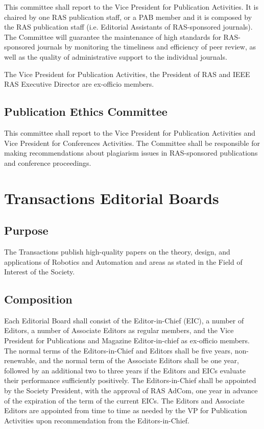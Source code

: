 \documentclass[10pt]{article}
\begin{document}
This committee shall report to the Vice President for Publication Activities. It is chaired by one RAS publication staff, or a PAB member and it is composed by the RAS publication staff (i.e. Editorial Assistants of RAS-sponsored journals). The Committee will guarantee the maintenance of high standards for RAS-sponsored journals by monitoring the timeliness and efficiency of peer review, as well as the quality of administrative support to the individual journals.

The Vice President for Publication Activities, the President of RAS and IEEE RAS Executive Director are ex-officio members.


\subsection{Publication Ethics Committee}

This committee shall report to the Vice President for Publication Activities and Vice President for Conferences Activities. The Committee shall be responsible for making recommendations about plagiarism issues in RAS-sponsored publications and conference proceedings.


\section{Transactions Editorial Boards}
\label{TEB}

\subsection{Purpose}

The Transactions publish high-quality papers on the theory, design, and applications of Robotics and Automation and areas as stated in the Field of Interest of the Society.

\subsection{Composition}
\label{TEB:Composition}
Each Editorial Board shall consist of the Editor-in-Chief (EIC), a number of Editors, a number of Associate Editors as regular members, and the Vice President for Publications and Magazine Editor-in-chief as ex-officio members.  The normal terms of the Editors-in-Chief and Editors shall be five years, non-renewable, and the normal term of the Associate Editors shall be one year, followed by an additional two to three years if the Editors and EICs evaluate their performance sufficiently positively. The Editors-in-Chief shall be appointed by the Society President, with the approval of RAS AdCom, one year in advance of the expiration of the term of the current EICs. The Editors and Associate Editors are appointed from time to time as needed by the VP for Publication Activities upon recommendation from the Editors-in-Chief.
\end{document}
